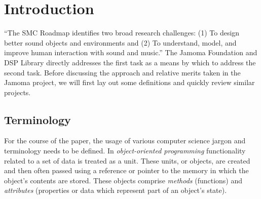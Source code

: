 \documentclass[twoside,10pt]{article}
\affiliation{}{}
\title{\papertitle}
\begin{document}
\sloppy
{} %
    
\maketitle


\begin{abstract}

This paper presents an object-oriented, reflective, application programming interface for C++, with an emphasis on real-time signal processing. 
The Jamoma Foundation and DSP Library provide a flexible framework and runtime environment, as well as an expanding collection of unit generators for synthesis, processing, and analysis.  It makes use of polymorphic typing, dynamic binding, and introspection to create a cross-platform environment pulling ideas from languages such as Smalltalk and Objective-C while remaining within the bounds of the portable and cross-platform C++ context. 
This library has been used in both open source and commercial software projects over the past several years.

\end{abstract}



\section{Introduction} %
\label{sec:introduction}

``The SMC Roadmap identifies two broad research challenges: (1) To design better sound objects and environments and (2) To understand, model, and improve human interaction with sound and music.'' \cite{serra:2007}  The Jamoma Foundation and DSP Library directly addresses the first task as a means by which to address the second task.  Before discussing the approach and relative merits taken in the Jamoma project, we will first lay out some definitions and quickly review similar projects.


\subsection{Terminology} %

For the course of the paper, the usage of various computer science jargon and terminology needs to be defined.  In \emph{object-oriented programming} functionality related to a set of data is treated as a unit.  These units, or objects, are created and then often passed using a reference or pointer to the memory in which the object's contents are stored.  These objects comprise \emph{methods} (functions) and \emph{attributes} (properties or data which represent part of an object's state).
\end{document}
